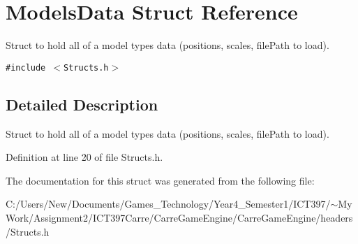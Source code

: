 \hypertarget{struct_models_data}{
\section{ModelsData Struct Reference}
\label{struct_models_data}
}
Struct to hold all of a model types data (positions, scales, filePath to load).  


{\tt \#include $<$Structs.h$>$}



\subsection{Detailed Description}
Struct to hold all of a model types data (positions, scales, filePath to load). 

Definition at line 20 of file Structs.h.

The documentation for this struct was generated from the following file:\begin{CompactItemize}
\item 
C:/Users/New/Documents/Games\_\-Technology/Year4\_\-Semester1/ICT397/$\sim$My Work/Assignment2/ICT397Carre/CarreGameEngine/CarreGameEngine/headers/Structs.h\end{CompactItemize}
